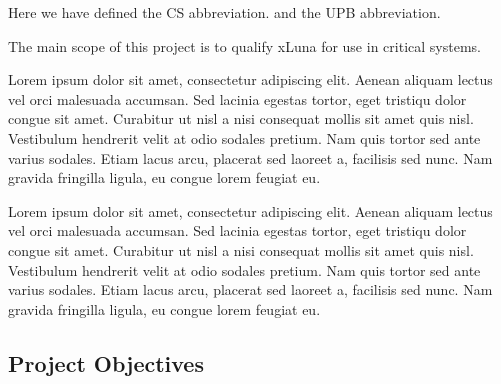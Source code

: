 Here we have defined the CS abbreviation. and the UPB abbreviation.

The main scope of this project is to qualify xLuna for use in critical systems.


Lorem ipsum dolor sit amet, consectetur adipiscing elit. Aenean aliquam lectus vel orci malesuada accumsan. Sed lacinia egestas tortor, eget tristiqu dolor congue sit amet. Curabitur ut nisl a nisi consequat mollis sit amet quis nisl. Vestibulum hendrerit velit at odio sodales pretium. Nam quis tortor sed ante varius sodales. Etiam lacus arcu, placerat sed laoreet a, facilisis sed nunc. Nam gravida fringilla ligula, eu congue lorem feugiat eu.

Lorem ipsum dolor sit amet, consectetur adipiscing elit. Aenean aliquam lectus vel orci malesuada accumsan. Sed lacinia egestas tortor, eget tristiqu dolor congue sit amet. Curabitur ut nisl a nisi consequat mollis sit amet quis nisl. Vestibulum hendrerit velit at odio sodales pretium. Nam quis tortor sed ante varius sodales. Etiam lacus arcu, placerat sed laoreet a, facilisis sed nunc. Nam gravida fringilla ligula, eu congue lorem feugiat eu.


\subsection{Project Objectives}
\label{sub-sec:proj-objectives}

